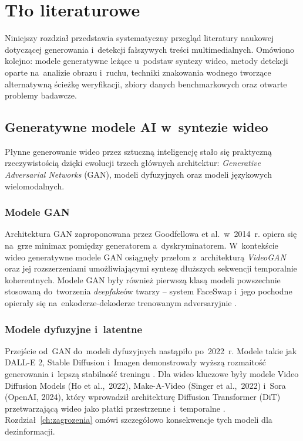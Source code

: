 \chapter{T\l{}o literaturowe}
\label{ch:tlo}

Niniejszy rozdzia\l{} przedstawia systematyczny przegl\k{a}d literatury naukowej
dotycz\k{a}cej generowania i~detekcji fa\l{}szywych tre\'{s}ci multimedialnych.
Om\'{o}wiono kolejno: modele generatywne leżące u~podstaw syntezy wideo,
metody detekcji oparte na~analizie obrazu i~ruchu, techniki znakowania wodnego
tworzące alternatywną ścieżkę weryfikacji, zbiory danych
benchmarkowych oraz otwarte problemy badawcze.

\section{Generatywne modele AI w~syntezie wideo}
\label{sec:modele_generatywne}

P\l{}ynne generowanie wideo przez sztuczn\k{a} inteligencj\k{e} sta\l{}o si\k{e}
praktyczn\k{a} rzeczywisto\'{s}ci\k{a} dzi\k{e}ki ewolucji trzech g\l{}\'{o}wnych
architektur: \textit{Generative Adversarial Networks} (GAN), modeli dyfuzyjnych
oraz modeli j\k{e}zykowych wielomodalnych.

\subsection{Modele GAN}

Architektura GAN zaproponowana przez Goodfellowa et al.\ w~2014~r.
\cite{Goodfellow2014GAN}
opiera si\k{e} na~grze minimax pomi\k{e}dzy generatorem a~dyskryminatorem.
W~kontekście wideo generatywne modele GAN osi\k{a}gn\k{e}\l{}y prze\l{}om
z~architektur\k{a} \textit{VideoGAN} \cite{Vondrick2016VideoGAN}
oraz jej rozszerzeniami umo\.{z}liwiaj\k{a}cymi syntez\k{e} d\l{}u\.{z}szych sekwencji
temporalnie koherentnych.
Modele GAN by\l{}y r\'{o}wnie\.{z} pierwsz\k{a} klas\k{a} modeli powszechnie stosowan\k{a}
do~tworzenia \textit{deepfake}\'{o}w twarzy -- system FaceSwap i~jego pochodne
opiera\l{}y si\k{e} na~enkoderze-dekoderze trenowanym adversaryjnie
\cite{Khan2025ComprehensiveSurvey}.

\subsection{Modele dyfuzyjne i~latentne}

Przej\'{s}cie od~GAN do~modeli dyfuzyjnych nast\k{a}pi\l{}o po~2022~r.
Modele takie jak DALL-E 2, Stable Diffusion i~Imagen demonstrowa\l{}y
wy\.{z}sz\k{a} rozmaito\'{s}\'{c} generowania i~lepsz\k{a} stabilno\'{s}\'{c} treningu
\cite{Ho2020DDPM}.
Dla wideo kluczowe by\l{}y modele Video Diffusion Models (Ho et al.,~2022),
Make-A-Video (Singer et al.,~2022) i~Sora (OpenAI, 2024), kt\'{o}ry
wprowadzi\l{} architektur\k{e} Diffusion Transformer (DiT) przetwarzaj\k{a}c\k{a}
wideo jako p\l{}atki przestrzenne i~temporalne
\cite{Videoworldsimulators2024}.
Rozdzia\l{}~\ref{ch:zagrozenia} om\'{o}wi szczeg\'{o}\l{}owo konsekwencje
tych modeli dla dezinformacji.

